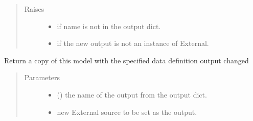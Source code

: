 \documentclass[letterpaper,10pt,english]{sphinxmanual}
\begin{document}
\begin{fulllineitems}
\begin{fulllineitems}
\begin{quote}
\begin{description}
\begin{itemize}
\end{itemize}

\item[{Raises}] \leavevmode\begin{itemize}
\item {} 
 \textendash{} if name is not in the output dict.

\item {} 
 \textendash{} if the new output is not an instance of External.

\end{itemize}

\end{description}\end{quote}

\end{fulllineitems}


\begin{fulllineitems}
\label{\detokenize{dalio.application:dalio.application.application.Application.with_output}}
Return a copy of this model with the specified data definition
output changed
\begin{quote}\begin{description}
\item[{Parameters}] \leavevmode\begin{itemize}
\item {} 
 () \textendash{} the name of the output from the output dict.

\item {} 
 \textendash{} new External source to be set as the output.

\end{itemize}

\end{description}\end{quote}

\end{fulllineitems}


\end{fulllineitems}
\end{document}
